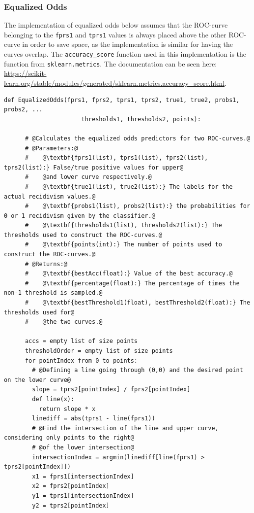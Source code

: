 \documentclass[11pt, fleqn, titlepage]{article}
\begin{document}
	\subsubsection{Equalized Odds}\label{Pseudo Equalized}
	The implementation of equalized odds below assumes that the ROC-curve belonging to the \texttt{fprs1} and \texttt{tprs1} values is always placed above the other ROC-curve in order to save space, as the implementation is similar for having the curves overlap. The \texttt{accuracy\_score} function used in this implementation is the function from \texttt{sklearn.metrics}. The documentation can be seen here: \url{https://scikit-learn.org/stable/modules/generated/sklearn.metrics.accuracy_score.html}.
	\begin{lstlisting}[escapechar=@,escapebegin=\itshape]
	def EqualizedOdds(fprs1, fprs2, tprs1, tprs2, true1, true2, probs1, probs2, ...
	                  thresholds1, thresholds2, points):
	                  
	  # @Calculates the equalized odds predictors for two ROC-curves.@
	  # @Parameters:@
	  #    @\textbf{fprs1(list), tprs1(list), fprs2(list), tprs2(list):} False/true positive values for upper@
	  #    @and lower curve respectively.@
	  #    @\textbf{true1(list), true2(list):} The labels for the actual recidivism values.@
	  #    @\textbf{probs1(list), probs2(list):} the probabilities for 0 or 1 recidivism given by the classifier.@
	  #    @\textbf{thresholds1(list), thresholds2(list):} The thresholds used to construct the ROC-curves.@
	  #    @\textbf{points(int):} The number of points used to construct the ROC-curves.@
	  # @Returns:@
	  #    @\textbf{bestAcc(float):} Value of the best accuracy.@
	  #    @\textbf{percentage(float):} The percentage of times the non-1 threshold is sampled.@
	  #    @\textbf{bestThreshold1(float), bestThreshold2(float):} The thresholds used for@
	  #    @the two curves.@
	  
	  accs = empty list of size points
	  thresholdOrder = empty list of size points
	  for pointIndex from 0 to points:
	    # @Defining a line going through (0,0) and the desired point on the lower curve@
	    slope = tprs2[pointIndex] / fprs2[pointIndex]
	    def line(x):
	      return slope * x
	    linediff = abs(tprs1 - line(fprs1))
	    # @Find the intersection of the line and upper curve, considering only points to the right@
	    # @of the lower intersection@
	    intersectionIndex = argmin(linediff[line(fprs1) > tprs2[pointIndex]])
  	    x1 = fprs1[intersectionIndex]
	    x2 = fprs2[pointIndex]
	    y1 = tprs1[intersectionIndex]
	    y2 = tprs2[pointIndex]
		

\end{lstlisting}
\end{document}
